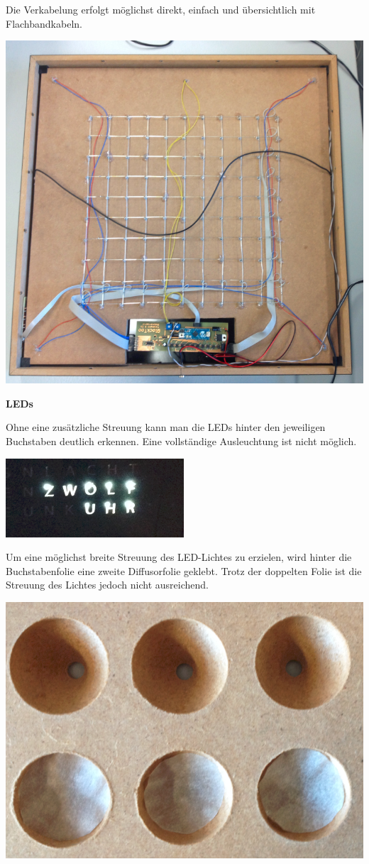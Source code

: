 \begin{multicols}{2}
{}
Die Verkabelung erfolgt möglichst direkt, einfach und übersichtlich mit Flachbandkabeln. 

{
\centering\includegraphics[width=0.85\columnwidth]{Abbildungen/Konstruktion/Platte04}

}

\textbf{LEDs}

Ohne eine zusätzliche Streuung kann man die LEDs hinter den jeweiligen Buchstaben deutlich erkennen. Eine vollständige Ausleuchtung ist nicht möglich. 

{
\centering\includegraphics[width=0.85\columnwidth]{Abbildungen/Konstruktion/LED03}

}
Um eine möglichst breite Streuung des LED-Lichtes zu erzielen, wird hinter die Buchstabenfolie eine zweite Diffusorfolie  geklebt. Trotz der doppelten Folie ist die Streuung des Lichtes jedoch nicht ausreichend. 

{
\centering\includegraphics[width=0.5\columnwidth]{Abbildungen/Konstruktion/Diffusor01}

}
\end{multicols}
